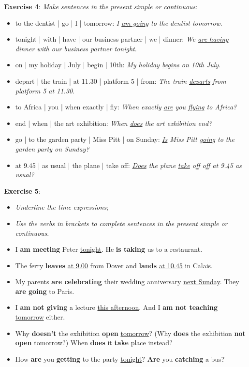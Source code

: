 \textbf{Exercise 4}: \textit{Make sentences in the present simple or continuous}:

\begin{itemize}

\item to the dentist | go | I | tomorrow: \textit{I \underline{am going} to the dentist tomorrow}.
\item tonight | with | have | our business partner | we | dinner: \textit{We \underline{are having} dinner with our business partner tonight}.
\item on | my holiday | July | begin | 10th: \textit{My holiday \underline{begins} on 10th July}.
\item depart | the train | at 11.30 | platform 5 | from: \textit{The train \underline{departs} from platform 5 at 11.30}.
\item to Africa | you | when exactly | fly: \textit{When exactly \underline{are} you \underline{flying} to Africa?}
\item end | when | the art exhibition: \textit{When \underline{does} the art exhibition end?}
\item go | to the garden party | Miss Pitt | on Sunday: \textit{\underline{Is} Miss Pitt \underline{going} to the garden party on Sunday?}
\item at 9.45 | as usual | the plane | take off: \textit{\underline{Does} the plane \underline{take} off off at 9.45 as usual?}
\end{itemize}


\textbf{Exercise 5}:

\begin{itemize}

\item\textit{Underline the time expressions};
\item\textit{Use the verbs in brackets to complete sentences in the present simple or continuous}.
\end{itemize}

\begin{itemize}

\item I \textbf{am meeting} Peter \underline{tonight}. He \textbf{is taking} us to a restaurant.
\item The ferry \textbf{leaves} \underline{at 9.00} from Dover and \textbf{lands} \underline{at 10.45} in Calais.
\item My parents \textbf{are celebrating} their wedding anniversary \underline{next Sunday}. They \textbf{are going} to Paris.
\item I \textbf{am not giving} a lecture \underline{this afternoon}. And I \textbf{am not teaching} \underline{tomorrow} either.
\item Why \textbf{doesn't} the exhibition \textbf{open} \underline{tomorrow}? (Why \textbf{does} the exhibition \textbf{not open} tomorrow?) When \textbf{does} it \textbf{take} place instead?
\item How \textbf{are} you \textbf{getting} to the party \underline{tonight}? \textbf{Are} you \textbf{catching} a bus? 

\end{itemize}

